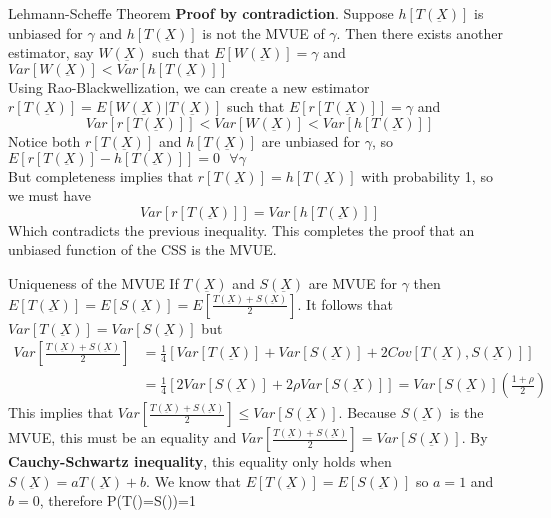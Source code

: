 \documentclass[avery5388,grid,frame]{flashcards}
\begin{document}
\begin{flashcard}[Proof]{Lehmann-Scheffe Theorem}
\textbf{Proof by contradiction}. Suppose $h[T(\underbar{X})]$ is unbiased for $\gamma$ and $h[T(\underbar{X})]$ is not the MVUE of $\gamma$. Then there exists another estimator, say $W(\underbar{X})$ such that $E[W(\underbar{X})]=\gamma$ and $Var[W(\underbar{X})]<Var[h[T(\underbar{X})]]$\\
Using Rao-Blackwellization, we can create a new estimator $r[T(\underbar{X})]=E[W(\underbar{X})|T(\underbar{X})]$ such that $E[r[T(\underbar{X})]]=\gamma$ and 
\begin{equation*}
Var[r[T(\underbar{X})]]<Var[W(\underbar{X})]<Var[h[T(\underbar{X})]]
\end{equation*}
Notice both $r[T(\underbar{X})]$ and $h[T(\underbar{X})]$ are unbiased for $\gamma$, so $E[r[T(\underbar{X})]-h[T(\underbar{X})]]=0 \textrm{      }\forall\gamma$\\
But completeness implies that $r[T(\underbar{X})]=h[T(\underbar{X})]$ with probability 1, so we must have
\begin{equation*}
Var[r[T(\underbar{X})]]=Var[h[T(\underbar{X})]]
\end{equation*}
Which contradicts the previous inequality. This completes the proof that an unbiased function of the CSS is the MVUE. 
\end{flashcard}
\begin{flashcard}[Proof]{Uniqueness of the MVUE}
If $T(\underbar{X})$ and $S(\underbar{X})$ are MVUE for $\gamma$ then $E[T(\underbar{X})]=E[S(\underbar{X})]=E\left[\frac{T(\underbar{X})+S(\underbar{X})}{2}\right]$. It follows that $Var[T(\underbar{X})]=Var[S(\underbar{X})]$ but
{\begin{align*}
Var\left[\frac{T(\underbar{X})+S(\underbar{X})}{2}\right]&=\frac{1}{4}\left[Var[T(\underbar{X})]+Var[S(\underbar{X})]+2Cov[T(\underbar{X}),S(\underbar{X})]\right]\\
&=\frac{1}{4}[2Var[S(\underbar{X})]+2\rho Var[S(\underbar{X})]]=Var[S(\underbar{X})]\left(\frac{1+\rho}{2}\right)
\end{align*}}
This implies that $Var\left[\frac{T(\underbar{X})+S(\underbar{X})}{2}\right]\leq Var[S(\underbar{X})]$. Because $S(\underbar{X})$ is the MVUE, this must be an equality and $Var\left[\frac{T(\underbar{X})+S(\underbar{X})}{2}\right]=Var[S(\underbar{X})]$. By \textbf{Cauchy-Schwartz inequality}, this equality only holds when $S(\underbar{X})=aT(\underbar{X})+b$. We know that $E[T(\underbar{X})]=E[S(\underbar{X})]$ so $a=1$ and $b=0$, therefore P(T()=S())=1
\end{flashcard}
\end{document}

